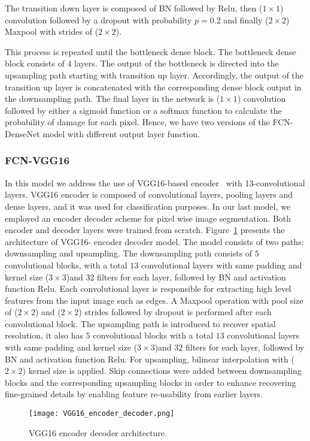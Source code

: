The transition down layer is composed of BN followed by Relu, then (\(1\times1\)) convolution followed by a dropout with probability \(p = 0.2\) and finally (\(2\times2\)) Maxpool with strides of (\(2\times2\)).

This process is repeated until the bottleneck dense block.
The bottleneck dense block consists of 4 layers.
The output of the bottleneck is directed into the upsampling path starting with transition up layer.
Accordingly, the output of the transition up layer is concatenated with the corresponding dense block output in the downsampling path.
The final layer in the network is  (\(1\times1\)) convolution followed by either a sigmoid function or a softmax function to calculate the probability of damage for each pixel.
Hence, we have two versions of the FCN-DenseNet model with different output layer function.


	\subsubsection{FCN-VGG16}
	In this model we address the use of VGG16-based encoder~\cite{Simonyan2015} with 13-convolutional layers.
	VGG16 encoder is composed of convolutional layers, pooling layers and dense layers, and it was used for classification purposes. 
	In our last model, we employed an encoder decoder scheme for pixel wise image segmentation. 
	Both encoder and decoder layers were trained from scratch.
	Figure~\ref{vgg16} presents the architecture of VGG16- encoder decoder model. 
	The model consists of two paths: downsampling and upsampling.
	The downsampling path consists of \(5\) convolutional blocks,  with a total \(13\) convolutional layers  with same padding and kernel size (\(3\times3\))and 32 filters for each layer, followed by BN and activation function Relu.
	Each convolutional layer is responsible for extracting high level features from the input image such as edges.
	A Maxpool operation with pool size of (\(2\times2\))  and (\(2\times2\)) strides followed by dropout is performed after each convolutional block. 
	The upsampling path is introduced to recover spatial resolution, it also has \(5\) convolutional blocks with a total \(13\) convolutional layers  with same padding and kernel size (\(3\times3\))and 32 filters for each layer, followed by BN and activation function Relu.
	For upsampling, bilinear interpolation with (\(2\times2\)) kernel size is applied.
	Skip connections were added between downsampling blocks and the corresponding upsampling blocks in order to enhance recovering fine-grained details by enabling feature re-usability from earlier layers.
	\begin{figure} [h!]
		\begin{center}
			\texttt{[image: VGG16\_encoder\_decoder.png]}
		\end{center}
		\caption{VGG16 encoder decoder architecture.} 
		\label{vgg16}
	\end{figure}
